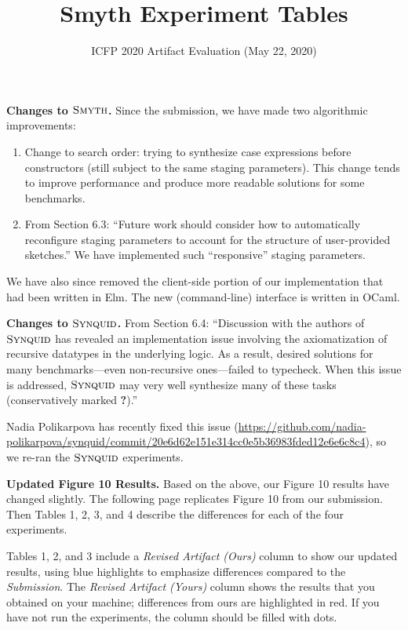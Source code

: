 \documentclass[acmsmall,nonacm]{acmart}
\newcommand{\snsMyth}
  {\ensuremath{\textsc{Smyth}}}
\newcommand{\synquid}
  {\ensuremath{\textsc{Synquid}}}
\begin{document}
\title{Smyth Experiment Tables}
\subtitle{ICFP 2020 Artifact Evaluation (May 22, 2020)}
\maketitle

\textbf{Changes to \snsMyth{}.}
%
Since the submission, we have made two algorithmic improvements:

\begin{enumerate}

\item Change to search order: trying to synthesize case expressions before
constructors (still subject to the same staging parameters). This change tends
to improve performance and produce more readable solutions for some benchmarks.

\item From Section 6.3: ``Future work should consider how to automatically
reconfigure staging parameters to account for the structure of user-provided
sketches.'' We have implemented such ``responsive'' staging parameters.

\end{enumerate}

We have also since removed the client-side portion of our implementation that
had been written in Elm. The new (command-line) interface is written in OCaml.

\vspace{0.30in}
\noindent
\textbf{Changes to \synquid{}.}
%
From Section 6.4: ``Discussion with the authors of \synquid{} has revealed an
implementation issue involving the axiomatization of recursive
datatypes in the underlying logic.
%
As a result, desired solutions for many benchmarks---even non-recursive
ones---failed to typecheck.
%
When this issue is addressed, \synquid{} may very well synthesize many
of these tasks (conservatively marked \textbf{?}).''

Nadia Polikarpova has recently fixed this issue
%
(\url{https://github.com/nadia-polikarpova/synquid/commit/20e6d62e151e314cc0e5b36983fded12e6e6c8c4}),
%
so we re-ran the \synquid{} experiments.


\vspace{0.30in}
\noindent
\textbf{Updated Figure 10 Results.}
%
Based on the above, our Figure 10 results have changed slightly.
%
The following page replicates Figure 10 from our submission.
%
Then Tables 1, 2, 3, and 4 describe the differences for each of the four
experiments.

Tables 1, 2, and 3 include a \textit{Revised Artifact (Ours)} column to show our
updated results, using blue highlights to emphasize differences compared to the
\textit{Submission}.
%
The \textit{Revised Artifact (Yours)} column shows the results that you obtained
on your machine; differences from ours are highlighted in red.
%
If you have not run the experiments, the column should be filled with dots.
\end{document}
